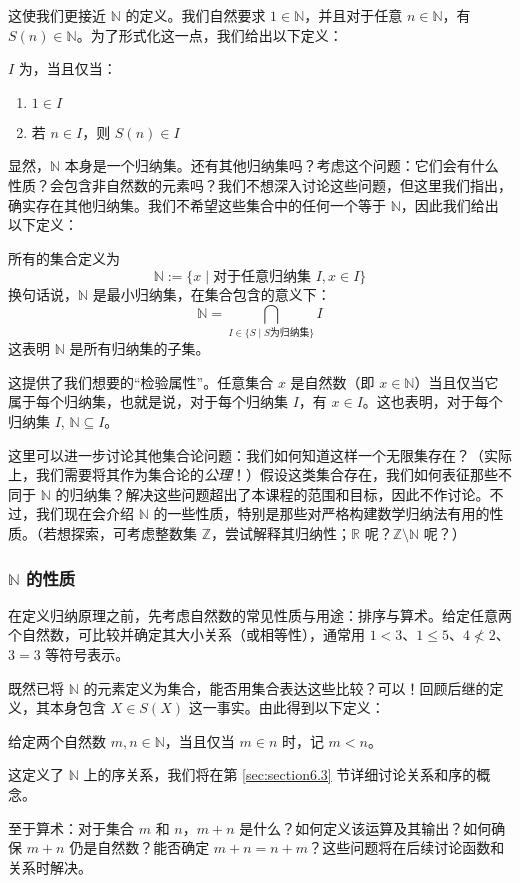 这使我们更接近 $\mathbb{N}$ 的定义。我们自然要求 $1 \in \mathbb{N}$，并且对于任意 $n \in \mathbb{N}$，有 $S(n) \in \mathbb{N}$。为了形式化这一点，我们给出以下定义：

\begin{definition}
    $I$ 为，当且仅当：
    \begin{enumerate}
        \item $1 \in I$
        \item 若 $n \in I$，则 $S(n) \in I$
    \end{enumerate}
\end{definition}

显然，$\mathbb{N}$ 本身是一个归纳集。还有其他归纳集吗？考虑这个问题：它们会有什么性质？会包含非自然数的元素吗？我们不想深入讨论这些问题，但这里我们指出，确实存在其他归纳集。我们不希望这些集合中的任何一个等于 $\mathbb{N}$，因此我们给出以下定义：

\begin{definition}
    所有的集合定义为
    \[\mathbb{N} := \{x \mid \text{对于任意归纳集\ } I, x \in I\}\]
    换句话说，$\mathbb{N}$ 是最小归纳集，在集合包含的意义下：
    \[\mathbb{N} = \bigcap_{I \in \{S \mid S \text{为归纳集}\}} I\]
    这表明 $\mathbb{N}$ 是所有归纳集的子集。
\end{definition}

这提供了我们想要的``检验属性''。任意集合 $x$ 是自然数（即 $x \in \mathbb{N}$）当且仅当它属于每个归纳集，也就是说，对于每个归纳集 $I$，有 $x \in I$。这也表明，对于每个归纳集 $I$, $\mathbb{N} \subseteq I$。

这里可以进一步讨论其他集合论问题：我们如何知道这样一个无限集存在？（实际上，我们需要将其作为集合论的\emph{公理}！）假设这类集合存在，我们如何表征那些不同于 $\mathbb{N}$ 的归纳集？解决这些问题超出了本课程的范围和目标，因此不作讨论。不过，我们现在会介绍 $\mathbb{N}$ 的一些性质，特别是那些对严格构建数学归纳法有用的性质。（若想探索，可考虑整数集 $\mathbb{Z}$，尝试解释其归纳性；$\mathbb{R}$ 呢？$\mathbb{Z} \setminus \mathbb{N}$ 呢？）

\subsubsection*{$\mathbb{N}$ 的性质}

在定义归纳原理之前，先考虑自然数的常见性质与用途：排序与算术。给定任意两个自然数，可比较并确定其大小关系（或相等性），通常用 $1 < 3$、$1 \le 5$、$4 \nless 2$、$3 = 3$ 等符号表示。

既然已将 $\mathbb{N}$ 的元素定义为集合，能否用集合表达这些比较？可以！回顾后继的定义，其本身包含 $X \in S(X)$ 这一事实。由此得到以下定义：

\begin{definition}
    给定两个自然数 $m, n \in \mathbb{N}$，当且仅当 $m \in n$ 时，记 $m < n$。
\end{definition}

这定义了 $\mathbb{N}$ 上的序关系，我们将在第 \ref{sec:section6.3} 节详细讨论关系和序的概念。

至于算术：对于集合 $m$ 和 $n$，$m + n$ 是什么？如何定义该运算及其输出？如何确保 $m + n$ 仍是自然数？能否确定 $m + n = n + m$？这些问题将在后续讨论函数和关系时解决。
